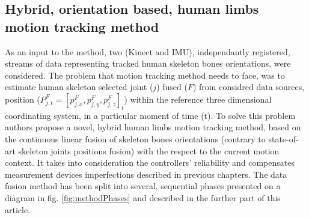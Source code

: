 \documentclass[sensors,article,submit,moreauthors,pdftex,10pt,a4paper]{mdpi}
\begin{document}
\subsection{Hybrid, orientation based, human limbs motion tracking method}
As an input to the method, two (Kinect and IMU), independantly registered, streams of data representing tracked human skeleton bones orientations, were considered. The problem that motion tracking method needs to face, was to estimate human skeleton selected joint ($j$) fused ($F$) from considred data sources, position ($P^F_{j,t} = [p^F_{j,x}, p^F_{j,y}, p^F_{j,z}]_t$) within the reference three dimensional coordinating system, in a particular moment of time (t). To solve this problem authors propose a novel, hybrid human limbs motion tracking method, based on the continuous linear fusion of skeleton bones orientations (contrary to state-of-art skeleton joints positions fusion) with the respect to the current motion context. It takes into consideration the controllers’ reliability and compensates measurement devices imperfections described in previous chapters. The data fusion method has been split into several, sequential phases presented on a diagram in fig. \ref{fig:methodPhases} and described in the further part of this article. 
		
\end{document}

